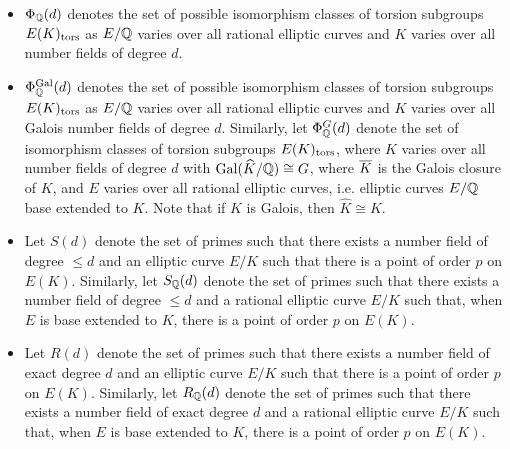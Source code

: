 	\begin{itemize}
	\item $\Phi_{\mathbb{Q}}(d)$ denotes the set of possible isomorphism classes of torsion subgroups $E(K)_{\text{tors}}$ as $E/\mathbb{Q}$ varies over all rational elliptic curves and $K$ varies over all number fields of degree $d$.
	\item $\Phi_{\mathbb{Q}}^{\operatorname{Gal}}(d)$ denotes the set of possible isomorphism classes of torsion subgroups $E(K)_{\text{tors}}$ as $E/\mathbb{Q}$ varies over all rational elliptic curves and $K$ varies over all Galois number fields of degree $d$. Similarly, let $\Phi_{\mathbb{Q}}^{G}(d)$ denote the set of isomorphism classes of torsion subgroups $E(K)_{\text{tors}}$, where $K$ varies over all number fields of degree $d$ with $\operatorname{Gal}(\widehat{K}/\mathbb{Q}) \cong G$, where $\overline{K}$ is the Galois closure of $K$, and $E$ varies over all rational elliptic curves, i.e. elliptic curves $E/\mathbb{Q}$ base extended to $K$. Note that if $K$ is Galois, then $\widehat{K} \cong K$.
	\item Let $S(d)$ denote the set of primes such that there exists a number field of degree $\leq d$ and an elliptic curve $E/K$ such that there is a point of order $p$ on $E(K)$. Similarly, let $S_{\mathbb{Q}}(d)$ denote the set of primes such that there exists a number field of degree $\leq d$ and a rational elliptic curve $E/K$ such that, when $E$ is base extended to $K$, there is a point of order $p$ on $E(K)$.
	\item Let $R(d)$ denote the set of primes such that there exists a number field of exact degree $d$ and an elliptic curve $E/K$ such that there is a point of order $p$ on $E(K)$. Similarly, let $R_{\mathbb{Q}}(d)$ denote the set of primes such that there exists a number field of exact degree $d$ and a rational elliptic curve $E/K$ such that, when $E$ is base extended to $K$, there is a point of order $p$ on $E(K)$.
	\end{itemize}


